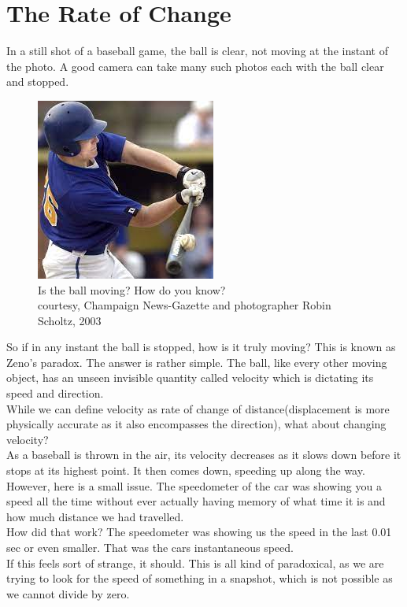 \section{The Rate of Change}
In a still shot of a baseball game, the ball is clear, not moving at the instant of the photo. A good camera can take many such photos each with the ball clear and stopped.\\ \begin{figure} [h]
    \centering
    \includegraphics[width=0.5\linewidth]{Photos/Baseball calc.png}
    \caption{Is the ball moving? How do you know?\\
    courtesy, Champaign News-Gazette and photographer Robin Scholtz, 2003}    
\end{figure}
So if in any instant the ball is stopped, how is it truly moving? This is known as Zeno's paradox. The answer is rather simple. The ball, like every other moving object, has an unseen invisible quantity called velocity which is dictating its speed and direction.\\
While we can define velocity as rate of change of distance(displacement is more physically accurate as it also encompasses the direction), what about changing velocity?\\
As a baseball is thrown in the air, its velocity decreases as it slows down before it stops at its highest point. It then comes down, speeding up along the way.\\
However, here is a small issue. The speedometer of the car was showing you a speed all the time without ever actually having memory of what time it is and how much distance we had travelled.\\ 
How did that work? The speedometer was showing us the speed in the last 0.01 sec or even smaller. That was the cars instantaneous speed.\\
If this feels sort of strange, it should. This is all kind of paradoxical, as we are trying to look for the speed of something in a snapshot, which is not possible as we cannot divide by zero.\\
